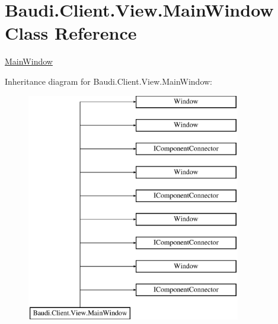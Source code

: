 \hypertarget{class_baudi_1_1_client_1_1_view_1_1_main_window}{}\section{Baudi.\+Client.\+View.\+Main\+Window Class Reference}
\label{class_baudi_1_1_client_1_1_view_1_1_main_window}


\hyperlink{class_baudi_1_1_client_1_1_view_1_1_main_window}{Main\+Window}  


Inheritance diagram for Baudi.\+Client.\+View.\+Main\+Window\+:\begin{figure}[H]
\begin{center}
\leavevmode
\includegraphics[height=10.000000cm]{class_baudi_1_1_client_1_1_view_1_1_main_window}
\end{center}
\end{figure}
